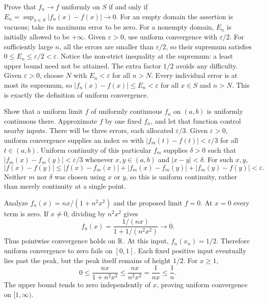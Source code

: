 \goal Prove that $f_n\to f$ uniformly on $S$ if and only if
$E_n=\sup_{x\in S}|f_n(x)-f(x)|\to0$.
For an empty domain the assertion is vacuous; take its maximum error to be zero.
For a nonempty domain, $E_n$ is initially allowed to be $+\infty$.
Given $\varepsilon>0$, use uniform convergence with $\varepsilon/2$.
For sufficiently large $n$, all the errors are smaller than $\varepsilon/2$,
so their supremum satisfies $0\le E_n\le\varepsilon/2<\varepsilon$.
Notice the non-strict inequality at the supremum: a least upper bound need
not be attained. The extra factor $1/2$ avoids any difficulty.
Given $\varepsilon>0$, choose $N$ with $E_n<\varepsilon$ for all $n>N$.
Every individual error is at most its supremum, so
$|f_n(x)-f(x)|\le E_n<\varepsilon$ for all $x\in S$ and $n>N$.
This is exactly the definition of uniform convergence.

\goal Show that a uniform limit $f$ of uniformly continuous $f_n$ on $(a,b)$
is uniformly continuous there.
\idea Approximate $f$ by one fixed $f_n$, and let that function control
nearby inputs. There will be three errors, each allocated $\varepsilon/3$.
Given $\varepsilon>0$, uniform convergence supplies an index $m$ with
$|f_m(t)-f(t)|<\varepsilon/3$ for all $t\in(a,b)$.
Uniform continuity of this particular $f_m$ supplies $\delta>0$ such that
$|f_m(x)-f_m(y)|<\varepsilon/3$ whenever $x,y\in(a,b)$ and $|x-y|<\delta$.
For such $x,y$,
\[
 |f(x)-f(y)|\le |f(x)-f_m(x)|+|f_m(x)-f_m(y)|+|f_m(y)-f(y)|
 <\varepsilon.
\]
Neither $m$ nor $\delta$ was chosen using $x$ or $y$, so this is uniform
continuity, rather than merely continuity at a single point.

\goal Analyze $f_n(x)=nx/(1+n^2x^2)$ and the proposed limit $f=0$.
At $x=0$ every term is zero. If $x\ne0$, dividing by $n^2x^2$ gives
\[
 f_n(x)=\frac{1/(nx)}{1+1/(n^2x^2)}\longrightarrow0.
\]
Thus pointwise convergence holds on $\mathbb{R}$.
At this input, $f_n(x_n)=1/2$. Therefore uniform convergence to zero fails
on $[0,1]$. Each fixed positive input eventually lies past the peak, but
the peak itself remains of height $1/2$.
For $x\ge1$,
\[
 0\le\frac{nx}{1+n^2x^2}\le\frac{nx}{n^2x^2}
 =\frac1{nx}\le\frac1n.
\]
The upper bound tends to zero independently of $x$, proving uniform
convergence on $[1,\infty)$.
\answer{Pointwise convergence holds everywhere; uniform convergence fails
on $[0,1]$ and holds on $[1,\infty)$.}

